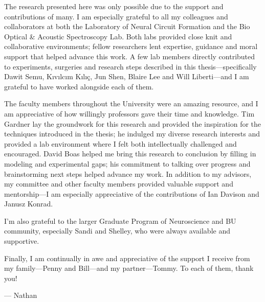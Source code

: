 The research presented here was only possible due to the support and 
contributions of many. I am especially grateful to all my 
colleagues and collaborators at both the Laboratory of Neural 
Circuit Formation and the Bio Optical \& Acoustic Spectroscopy Lab. 
Both labs provided close knit and collaborative environments; 
fellow researchers lent expertise, guidance and moral support 
that helped advance this work. A few lab members directly contributed 
to experiments, surgeries and research steps described in this 
thesis---specifically Dawit Semu, K{\i}v{\i}lc{\i}m K{\i}l{\i}\c{c}, 
Jun Shen, Blaire Lee and Will Liberti---and I am grateful to have
worked alongside each of them.

The faculty members throughout the University were an amazing resource, and I 
am appreciative of how willingly professors gave their time and 
knowledge. Tim Gardner lay the groundwork for this research and 
provided the inspiration for the techniques introduced in the 
thesis; he indulged my diverse research interests and provided a 
lab environment where I felt both intellectually challenged and 
encouraged. David Boas helped me bring this research to conclusion 
by filling in modeling and experimental gaps; his commitment to 
talking over progress and brainstorming next steps helped advance 
my work. In addition to my advisors, my committee and other 
faculty members provided valuable support and mentorship---I 
am especially appreciative of the contributions of Ian Davison
and Janusz Konrad.

I'm also grateful to the larger Graduate Program of Neuroscience 
and BU community, especially Sandi and Shelley, who were always 
available and supportive.

Finally, I am continually in awe and appreciative of the support 
I receive from my family---Penny and Bill---and my partner---Tommy. 
To each of them, thank you!

--- Nathan
